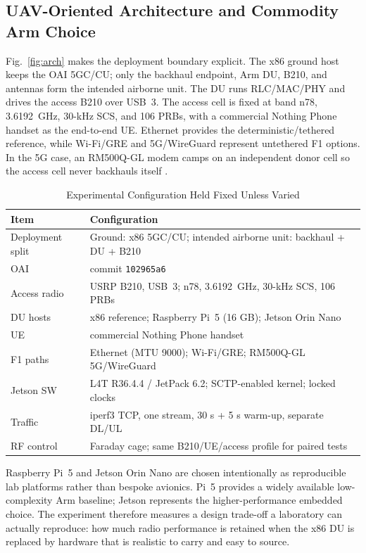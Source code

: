 \documentclass[conference]{IEEEtran}
\begin{document}
\subsection{UAV-Oriented Architecture and Commodity Arm Choice}
Fig.~\ref{fig:arch} makes the deployment boundary explicit. The x86 ground
host keeps the OAI 5GC/CU; only the backhaul endpoint, Arm DU, B210, and
antennas form the intended airborne unit. The DU runs RLC/MAC/PHY and drives
the access B210 over USB~3. The access cell is fixed at band n78, 3.6192~GHz,
30-kHz SCS, and 106 PRBs, with a commercial Nothing Phone handset as the
end-to-end UE. Ethernet provides the deterministic/tethered reference, while
Wi-Fi/GRE and 5G/WireGuard represent untethered F1 options. In the 5G case, an
RM500Q-GL modem camps on an independent donor cell so the access cell never
backhauls itself \cite{artifactrepo}.

\begin{table}[t]
\caption{Experimental Configuration Held Fixed Unless Varied}
\label{tab:config}
\centering\scriptsize
\begin{tabularx}{\columnwidth}{@{}lX@{}}
\toprule
\textbf{Item} & \textbf{Configuration}\\
\midrule
Deployment split & Ground: x86 5GC/CU; intended airborne unit: backhaul + DU + B210\\
OAI & commit \texttt{102965a6}\\
Access radio & USRP B210, USB~3; n78, 3.6192~GHz, 30-kHz SCS, 106 PRBs\\
DU hosts & x86 reference; Raspberry Pi~5 (16 GB); Jetson Orin Nano\\
UE & commercial Nothing Phone handset\\
F1 paths & Ethernet (MTU 9000); Wi-Fi/GRE; RM500Q-GL 5G/WireGuard\\
Jetson SW & L4T R36.4.4 / JetPack 6.2; SCTP-enabled kernel; locked clocks\\
Traffic & iperf3 TCP, one stream, 30 s + 5 s warm-up, separate DL/UL\\
RF control & Faraday cage; same B210/UE/access profile for paired tests\\
\bottomrule
\end{tabularx}
\end{table}

Raspberry Pi~5 and Jetson Orin Nano are chosen intentionally as reproducible
lab platforms rather than bespoke avionics. Pi~5 provides a widely available
low-complexity Arm baseline; Jetson represents the higher-performance embedded
choice. The experiment therefore measures a design trade-off a laboratory can
actually reproduce: how much radio performance is retained when the x86 DU is
replaced by hardware that is realistic to carry and easy to source.
\end{document}
